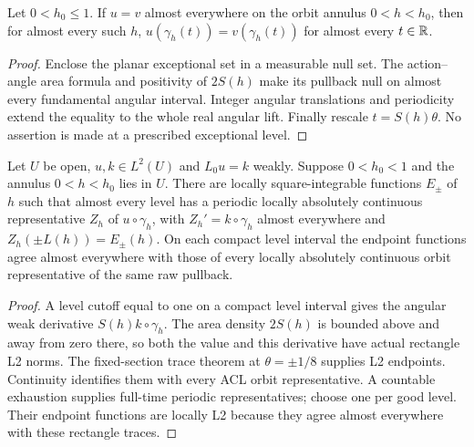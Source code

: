\begin{lemma}
\label{lem:orbit-ae-congruence}
\leanok
Let $0<h_0\le1$. If $u=v$ almost everywhere on the orbit annulus
$0<h<h_0$, then for almost every such $h$,
$u(\gamma_h(t))=v(\gamma_h(t))$ for almost every $t\in\mathbb{R}$.
\end{lemma}

\begin{proof}
\leanok
Enclose the planar exceptional set in a measurable null set. The
action--angle area formula and positivity of $2S(h)$ make its pullback
null on almost every fundamental angular interval.
Integer angular translations and periodicity extend the equality to
the whole real angular lift. Finally rescale $t=S(h)\theta$.
No assertion is made at a prescribed exceptional level.
\end{proof}

\begin{lemma}
\label{lem:orbit-l2-endpoints}
\leanok
Let $U$ be open, $u,k\in L^2(U)$ and $L_0u=k$ weakly.
Suppose $0<h_0<1$ and the annulus $0<h<h_0$ lies in $U$.
There are locally square-integrable functions $E_\pm$ of $h$ such that
almost every level has a periodic locally absolutely continuous
representative $Z_h$ of $u\circ\gamma_h$, with
$Z_h'=k\circ\gamma_h$ almost everywhere and
$Z_h(\pm L(h))=E_\pm(h)$.
On each compact level interval the endpoint functions agree almost
everywhere with those of every locally absolutely continuous orbit
representative of the same raw pullback.
\end{lemma}

\begin{proof}
\leanok
A level cutoff equal to one on a compact level interval gives the angular
weak derivative $S(h)k\circ\gamma_h$.
The area density $2S(h)$ is bounded above and away from zero there, so
both the value and this derivative have actual rectangle L2 norms.
The fixed-section trace theorem at $\theta=\pm1/8$ supplies L2 endpoints.
Continuity identifies them with every ACL orbit representative.
A countable exhaustion supplies full-time periodic representatives; choose
one per good level. Their endpoint functions are locally L2 because they
agree almost everywhere with these rectangle traces.
\end{proof}

